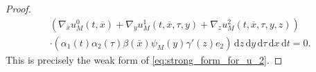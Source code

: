 \documentclass[10pt,a4paper]{amsart}
\def\T{\mathcal{T}}
\newcommand{\di}[1]{\,\mathrm{d}#1}
\begin{document}
\begin{proof}
\begin{multline*}
    \left( \nabla_{\overline{x}}u_M^0(t,\overline{x})+\nabla_y u_M^1(t,\overline{x},\tau,y)+\nabla_zu_M^2(t,\overline{x},\tau,y,z)\right)\\
    \cdot ( \alpha_1(t)\alpha_2(\tau)\beta(\bar x) \psi_M(y)\gamma'(z)e_2) \di{z}\di{y}\di{\tau}\di{x}\di{t}=0.
\end{multline*}
This is precisely the weak form of  \eqref{eq:strong_form_for_u_2}.
\end{proof}
\end{document}
